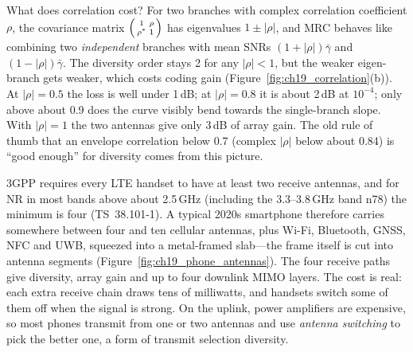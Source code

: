 What does correlation cost? For two branches with complex correlation coefficient $\rho$, the
covariance matrix $\begin{psmallmatrix}1&\rho\\\rho^*&1\end{psmallmatrix}$ has eigenvalues
$1\pm|\rho|$, and MRC behaves like combining two \emph{independent} branches with mean SNRs
$(1+|\rho|)\bar\gamma$ and $(1-|\rho|)\bar\gamma$. The diversity order stays 2 for any
$|\rho|<1$, but the weaker eigen-branch gets weaker, which costs coding gain
(Figure~\ref{fig:ch19_correlation}(b)). At $|\rho|=0.5$ the loss is well under 1\,dB; at
$|\rho|=0.8$ it is about 2\,dB at $10^{-4}$; only above about 0.9 does the curve visibly bend
towards the single-branch slope. With $|\rho|=1$ the two antennas give only 3\,dB of array gain. The
old rule of thumb that an envelope correlation below 0.7 (complex $|\rho|$ below about 0.84) is
``good enough'' for diversity comes from this picture.


\begin{inpractice}
3GPP requires every LTE handset to have at least two receive antennas, and for NR in most bands
above about 2.5\,GHz (including the 3.3--3.8\,GHz band n78) the minimum is four (TS~38.101-1). A
typical 2020s smartphone therefore carries somewhere between four and ten cellular antennas,
plus Wi-Fi, Bluetooth, GNSS, NFC and UWB, squeezed into a metal-framed slab---the frame itself is
cut into antenna segments (Figure~\ref{fig:ch19_phone_antennas}). The four receive paths give
diversity, array gain and up to four downlink MIMO layers. The cost is real: each extra receive
chain draws tens of milliwatts, and handsets switch some of them off when the signal is strong. On
the uplink, power amplifiers are expensive, so most phones transmit from one or two antennas and
use \emph{antenna switching} to pick the better one, a form of transmit selection diversity.
\end{inpractice}


